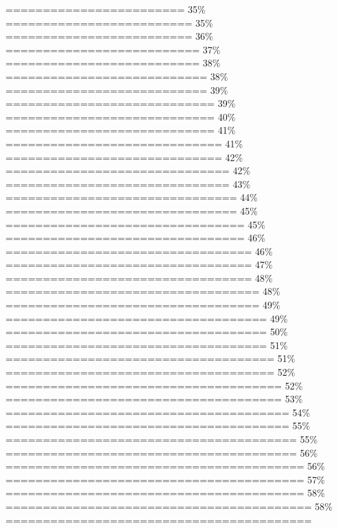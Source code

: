 \documentclass[
]{article}
\begin{document}
\textbar======================== \textbar{} 35\% \textbar{}
\textbar========================= \textbar{} 35\% \textbar{}
\textbar========================= \textbar{} 36\% \textbar{}
\textbar========================== \textbar{} 37\% \textbar{}
\textbar========================== \textbar{} 38\% \textbar{}
\textbar=========================== \textbar{} 38\% \textbar{}
\textbar=========================== \textbar{} 39\% \textbar{}
\textbar============================ \textbar{} 39\% \textbar{}
\textbar============================ \textbar{} 40\% \textbar{}
\textbar============================ \textbar{} 41\% \textbar{}
\textbar============================= \textbar{} 41\% \textbar{}
\textbar============================= \textbar{} 42\% \textbar{}
\textbar============================== \textbar{} 42\% \textbar{}
\textbar============================== \textbar{} 43\% \textbar{}
\textbar=============================== \textbar{} 44\% \textbar{}
\textbar=============================== \textbar{} 45\% \textbar{}
\textbar================================ \textbar{} 45\% \textbar{}
\textbar================================ \textbar{} 46\% \textbar{}
\textbar================================= \textbar{} 46\% \textbar{}
\textbar================================= \textbar{} 47\% \textbar{}
\textbar================================= \textbar{} 48\% \textbar{}
\textbar================================== \textbar{} 48\% \textbar{}
\textbar================================== \textbar{} 49\% \textbar{}
\textbar=================================== \textbar{} 49\% \textbar{}
\textbar=================================== \textbar{} 50\% \textbar{}
\textbar=================================== \textbar{} 51\% \textbar{}
\textbar==================================== \textbar{} 51\% \textbar{}
\textbar==================================== \textbar{} 52\% \textbar{}
\textbar===================================== \textbar{} 52\% \textbar{}
\textbar===================================== \textbar{} 53\% \textbar{}
\textbar====================================== \textbar{} 54\%
\textbar{} \textbar====================================== \textbar{}
55\% \textbar{} \textbar=======================================
\textbar{} 55\% \textbar{}
\textbar======================================= \textbar{} 56\%
\textbar{} \textbar======================================== \textbar{}
56\% \textbar{} \textbar========================================
\textbar{} 57\% \textbar{}
\textbar======================================== \textbar{} 58\%
\textbar{} \textbar========================================= \textbar{}
58\% \textbar{} \textbar=========================================
\end{document}
